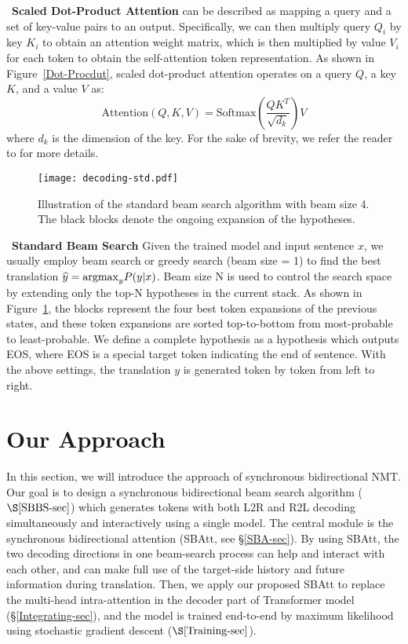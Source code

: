 \documentclass[11pt,a4paper]{article}
\begin{document}
\begin{CJK*}{UTF8}{gbsn}
~\textbf{Scaled Dot-Product Attention} can be described as mapping a query and a set of key-value pairs to an output. 
Specifically, we can then multiply query $Q_i$ by key $K_i$ to obtain an attention weight matrix, which is then multiplied by value $V_i$ for each token to obtain the self-attention token representation.
As shown in Figure~\ref{Dot-Procdut}, scaled dot-product attention operates on a query $Q$, a key $K$, and a value $V$ as:
\begin{equation}
    \mbox{Attention}(Q,K,V) = \mbox{Softmax}(\frac{QK^T}{\sqrt{d_k}})V   \label{attention}
\end{equation}
where $d_k$ is the dimension of the key. For the sake of brevity, we refer the reader to  for more details.

\begin{figure}
	\centering
	\texttt{[image: decoding-std.pdf]}
	\caption{Illustration of the standard beam search algorithm with beam size 4. The black blocks denote the ongoing expansion of the hypotheses.
	}\label{decoding-std}
\end{figure}

~\textbf{Standard Beam Search}
Given the trained model and input sentence $x$, we usually employ beam search or greedy search (beam size = 1) to find the best translation $\widehat{y}={\rm{argmax}}_yP(y|x)$.
Beam size N is used to control the search space by extending only the top-N hypotheses in the current stack.
As shown in Figure~\ref{decoding-std}, the blocks represent the four best token expansions of the previous states, and these token expansions are sorted top-to-bottom from most-probable to least-probable.
We define a complete hypothesis as a hypothesis which outputs EOS, where EOS is a special target token indicating the end of sentence.
With the above settings, the translation $y$ is generated token by token from left to right.


\section{Our Approach}

In this section, we will introduce the approach of synchronous bidirectional NMT. Our goal is to design a synchronous bidirectional beam search algorithm  ($\S\ref{SBBS-sec}$) which generates tokens with both L2R and R2L decoding simultaneously and interactively using a single model.
The central module is the synchronous bidirectional attention (SBAtt, see \S\ref{SBA-sec}). By using SBAtt, the two decoding directions in one beam-search process can help and interact with each other, and can make full use of the target-side history and future information during translation.
Then, we apply our proposed SBAtt to replace the multi-head intra-attention in the decoder part of Transformer model (\S\ref{Integrating-sec}),
and the model is trained end-to-end by maximum likelihood using stochastic gradient descent ($\S\ref{Training-sec}$).


\end{CJK*}
\end{document}
